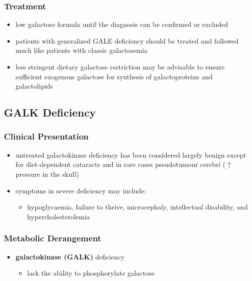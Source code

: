 \documentclass[12pt]{scrartcl}
\begin{document}
\subsubsection{Treatment}
\label{sec:orge066400}
\begin{itemize}
\item low galactose formula until the diagnosis can be confirmed or excluded
\item patients with generalized GALE deficiency should be treated and
followed much like patients with classic galactosemia
\item less stringent dietary galactose restriction may be advisable to
ensure sufficient exogenous galactose for synthesis of
galactoproteins and galactolipids
\end{itemize}
\subsection{GALK Deficiency}
\label{sec:orged8f91c}
\subsubsection{Clinical Presentation}
\label{sec:orgfb26002}
\begin{itemize}
\item untreated galactokinase deficiency has been considered largely
benign except for diet-dependent cataracts and in rare cases
pseudotumour cerebri (\(\uparrow\) pressure in the skull)
\item symptoms in severe deficiency may include:
\begin{itemize}
\item hypoglycaemia, failure to thrive, microcephaly, intellectual
disability, and hypercholesterolemia
\end{itemize}
\end{itemize}

\subsubsection{Metabolic Derangement}
\label{sec:orge5a495b}
\begin{itemize}
\item \textbf{galactokinase (GALK)} deficiency
\begin{itemize}
\item lack the ability to phosphorylate galactose
\end{itemize}
\end{itemize}
\end{document}
